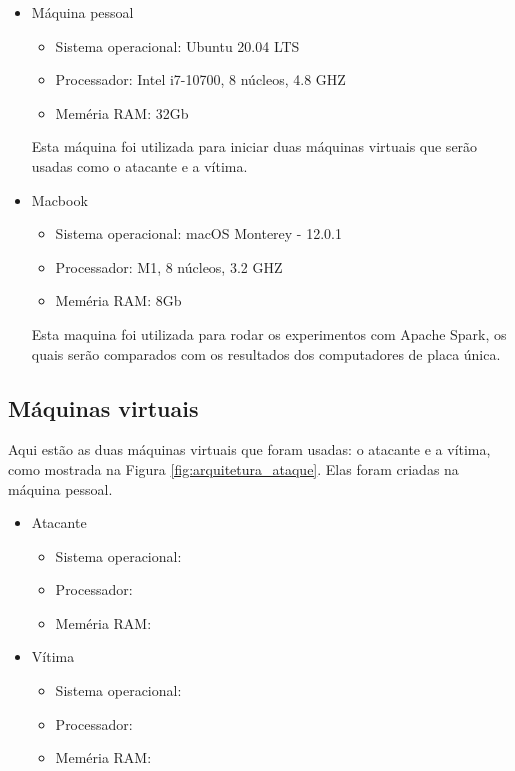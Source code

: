 \begin{itemize}
    \item Máquina pessoal
        \begin{itemize}
            \item Sistema operacional: Ubuntu 20.04 LTS
            \item Processador: Intel i7-10700, 8 núcleos, 4.8 GHZ
            \item Meméria RAM: 32Gb
        \end{itemize}
        Esta máquina foi utilizada para iniciar duas máquinas virtuais que serão usadas 
        como o atacante e a vítima.
    \item Macbook 
        \begin{itemize}
            \item Sistema operacional: macOS Monterey - 12.0.1
            \item Processador: M1, 8 núcleos, 3.2 GHZ
            \item Meméria RAM: 8Gb
        \end{itemize}        
        Esta maquina foi utilizada para rodar os experimentos com Apache Spark, os quais 
        serão comparados com os resultados dos computadores de placa única.
\end{itemize}


\subsection{Máquinas virtuais}

Aqui estão as duas máquinas virtuais que foram usadas: o atacante e a vítima, como mostrada na Figura \ref{fig:arquitetura_ataque}. 
Elas foram criadas na máquina pessoal.

\begin{itemize}
    \item Atacante
        \begin{itemize}
            \item Sistema operacional:
            \item Processador: 
            \item Meméria RAM: 
        \end{itemize}
    \item Vítima
        \begin{itemize}
            \item Sistema operacional: 
            \item Processador: 
            \item Meméria RAM: 
        \end{itemize}        
\end{itemize}



